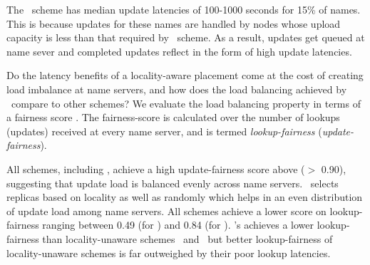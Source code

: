 The \replicateall\ scheme has median update latencies of 100-1000 seconds for 15\% of names. This is because updates for these names are handled by nodes whose upload capacity is less than that required by \replicateall\ scheme. As a result, updates get queued at name sever and completed updates reflect in the form of high update latencies. 


Do the latency benefits of  a locality-aware placement come at the cost of creating load imbalance at name servers, and how does the load balancing achieved by \locaware\ compare to other schemes? We evaluate the load balancing property in terms of a fairness score \cite{jain-fairness}. The fairness-score is calculated over the number of lookups (updates) received at every name server, and is termed \emph{lookup-fairness} (\emph{update-fairness}). 

All schemes, including \auspice, achieve a  high update-fairness score above ($>$ 0.90), suggesting that update load is balanced evenly across name servers. 
\auspice\ selects replicas based on locality as well as randomly which helps in an even distribution of update load among name servers. 
All schemes achieve a lower score on lookup-fairness ranging between 0.49 (for \replicateall) and 0.84 (for \staticthree). \auspice's achieves a lower lookup-fairness than locality-unaware schemes \staticthree\ and \codons\, but better lookup-fairness of locality-unaware schemes is far outweighed by their poor lookup latencies.







